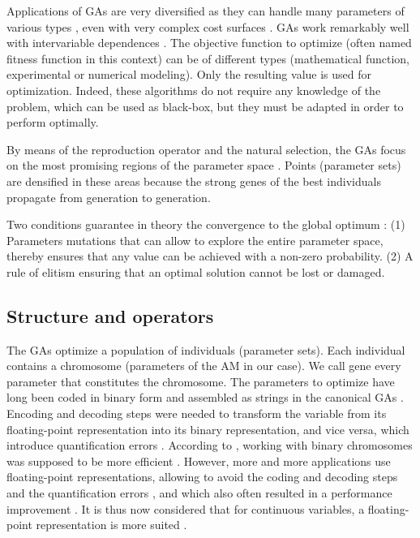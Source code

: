\documentclass[twocol]{ametsoc}
\begin{document}
Applications of GAs are very diversified as they can handle many parameters of various types \citep{Joines1996a}, even with very complex cost surfaces \citep{Haupt2004}. GAs work remarkably well with intervariable dependences \citep{Haupt2004}. The objective function to optimize (often named fitness function in this context) can be of different types (mathematical function, experimental or numerical modeling). Only the resulting value is used for optimization. Indeed, these algorithms do not require any knowledge of the problem, which can be used as black-box, but they must be adapted in order to perform optimally.

By means of the reproduction operator and the natural selection, the GAs focus on the most promising regions of the parameter space \citep{Holland1992b}. Points (parameter sets) are densified in these areas because the strong genes of the best individuals propagate from generation to generation.

Two conditions guarantee in theory the convergence to the global optimum \citep{Zitzler2004a}: (1) Parameters mutations that can allow to explore the entire parameter space, thereby ensures that any value can be achieved with a non-zero probability. (2) A rule of elitism ensuring that an optimal solution cannot be lost or damaged.


\subsection{Structure and operators}

The GAs optimize a population of individuals (parameter sets). Each individual contains a chromosome (parameters of the AM in our case). We call gene every parameter that constitutes the chromosome. The parameters to optimize have long been coded in binary form and assembled as strings in the canonical GAs \citep{Goldberg1989}. Encoding and decoding steps were needed to transform the variable from its floating-point representation into its binary representation, and vice versa, which introduce quantification errors \citep{Haupt2004}. According to \citet{Holland1992b}, working with binary chromosomes was supposed to be more efficient \citep{Goldberg1990a, Back1993b}. However, more and more applications use floating-point representations, allowing to avoid the coding and decoding steps and the quantification errors \citep{Haupt2004}, and which also often resulted in a performance improvement \citep{Goldberg1990a}. It is thus now considered that for continuous variables, a floating-point representation is more suited \citep{Michalewicz1996, Herrera1998a, Haupt2004, Back1996b, Gaffney2010a}. 
\end{document}
